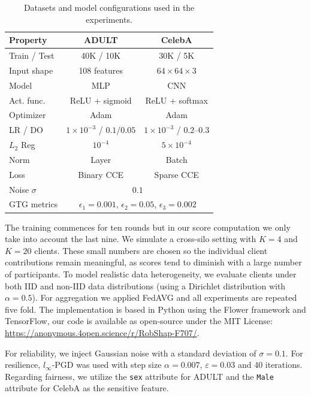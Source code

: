\documentclass[sigconf]{acmart}
\begin{document}
\begin{table}[!t]
	\centering
	\setlength{\tabcolsep}{2pt}
	\begin{tabular}{|l||c|c|}
		\hline
		\textbf{Property} & \textbf{ADULT} & \textbf{CelebA} \\
		\hline\hline
		Train / Test & 40K / 10K & 30K / 5K \\
		\hline
		Input shape & 108 features & $64\times64\times3$ \\
		Model & MLP & CNN \\
		Act. func. & ReLU + sigmoid & ReLU + softmax \\
		Optimizer & Adam & Adam \\
		LR / DO & $1\times10^{-3}$ / $0.1$/$0.05$ & $1\times10^{-3}$ / $0.2$--$0.3$ \\
		$L_2$ Reg & $10^{-4}$ & $5\times10^{-4}$ \\
		Norm & Layer & Batch \\
		Loss & Binary CCE & Sparse CCE \\
		\hline
		Noise $\sigma$ & \multicolumn{2}{c|}{$0.1$} \\
		\hline
		GTG metrics & \multicolumn{2}{c|}{$\epsilon_1=0.001$, $\epsilon_2=0.05$, $\epsilon_3=0.002$} \\
		\hline
	\end{tabular}
	\caption{Datasets and model configurations used in the experiments.}
	\label{tab:hyper}
\end{table}

The training commences for ten rounds but in our score computation we only take into account the last nine. We simulate a cross-silo setting with $K=4$ and $K=20$ clients. These small numbers are chosen so the individual client contributions remain meaningful, as scores tend to diminish with a large number of participants. To model realistic data heterogeneity, we evaluate clients under both IID and non-IID data distributions (using a Dirichlet distribution with $\alpha=0.5$). For aggregation we applied FedAVG and all experiments are repeated five fold. The implementation is based in Python using the Flower framework and TensorFlow, our code is available as open-source under the MIT License: \url{https://anonymous.4open.science/r/RobShap-F707/}.

For reliability, we inject Gaussian noise with a standard deviation of $\sigma=0.1$. For resilience, $l_\infty$-PGD was used with step size $\alpha=0.007$, $\varepsilon=0.03$ and 40 iterations. Regarding fairness, we utilize the \texttt{sex} attribute for ADULT and the \texttt{Male} attribute for CelebA as the sensitive feature.
 
\end{document}
